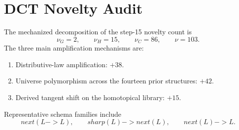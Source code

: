 \documentclass[11pt,a4paper]{article}
\def\to{->}%
\def\sharp{sharp}%
\def\bigcirc{next}%
\theoremstyle{plain}
\theoremstyle{definition}
\theoremstyle{remark}
\begin{document}
\section{DCT Novelty Audit}
\label{app:dct-audit}

The mechanized decomposition of the step-15 novelty count is
\[
  \nu_G=2,
  \qquad
  \nu_H=15,
  \qquad
  \nu_C=86,
  \qquad
  \nu=103.
\]
The three main amplification mechanisms are:
\begin{enumerate}[nosep]
    \item Distributive-law amplification: $+38$.
    \item Universe polymorphism across the fourteen prior structures: $+42$.
    \item Derived tangent shift on the homotopical library: $+15$.
\end{enumerate}

Representative schema families include
\[
  \bigcirc(L\to L),
  \qquad
  \sharp(L)\to \bigcirc(L),
  \qquad
  \bigcirc(L)\to L.
\]
\end{document}
